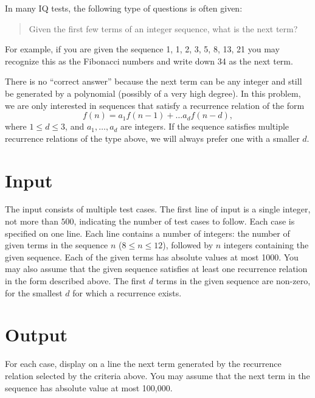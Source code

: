 
%
In many IQ tests, the following type of questions is often given:
\begin{quote}
  Given the first few terms of an integer sequence, what is the next
  term?
\end{quote}
For example, if you are given the sequence 1, 1, 2, 3, 5, 8, 13, 21 you
may recognize this as the Fibonacci numbers and write down 34 as the
next term.

There is no ``correct answer'' because the next term can be any integer
and still be generated by a polynomial (possibly of a very high degree).
In this problem, we are only interested in sequences that satisfy a
recurrence relation of the form
\[ f(n) = a_1 f(n-1) + \ldots a_d f(n-d), \] 
where $1 \leq d \leq 3$, and $a_1, \ldots, a_d$ are integers.  If the
sequence satisfies multiple recurrence relations of the type above, we
will always prefer one with a smaller $d$.

\section*{Input}

The input consists of multiple test cases. The first line of input 
is a single integer, not more than $500$, indicating the number
of test cases to follow.  
Each case is
specified on one line.  Each line contains a number of integers: the
number of given terms in the sequence $n$ ($8 \leq n \leq 12$),
followed by $n$ integers containing the given sequence.  Each of the
given terms has absolute values at most 1000.  You may also assume
that the given sequence satisfies at least one recurrence relation in
the form described above.  The first $d$ terms in the given sequence
are non-zero, for the smallest $d$ for which a recurrence exists.


\section*{Output}

For each case, display on a line the next term generated by the recurrence
relation selected by the criteria above.
You may assume that the next term in the sequence has absolute value 
at most 100,000.  



